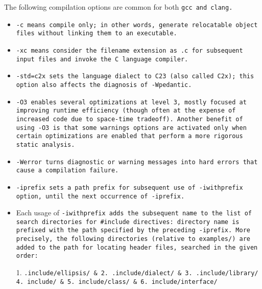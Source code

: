The following compilation options are common for both \tt{gcc} and \tt{clang}.

\begin{itemize}

\item \tt{-c} means compile only; in other words, generate
relocatable object files without linking them to an executable.

\item \tt{-xc} means consider the filename extension as \tt{.c}
for subsequent input files and invoke the C language compiler.

\item \tt{-std=c2x} sets the language dialect to C23 (also called C2x);
this option also affects the diagnosis of \tt{-Wpedantic}.

\item \tt{-O3} enables several optimizations at
level 3, mostly focused at improving runtime efficiency
(though often at the expense of increased code due to space-time tradeoff).
Another benefit of using \tt{-O3} is that some warnings
options are activated only when certain optimizations are
enabled that perform a more rigorous static analysis.

\item \tt{-Werror} turns diagnostic or warning messages
into hard errors that cause a compilation failure.

\item \tt{-iprefix} sets a path prefix for subsequent use of
\tt{-iwithprefix} option, until the next occurrence of \tt{-iprefix}.

\item Each usage of \tt{-iwithprefix} adds the subsequent name to the
list of search directories for \tt{#include} directives: directory name
is prefixed with the path specified by the preceding \tt{-iprefix}.
More precisely, the following directories (relative to \tt{examples/}) are
added to the path for locating header files, searched in the given order:

\enlargethispage*{\baselineskip}


1. \tt{.include/ellipsis/} & 2. \tt{.include/dialect/} & 3. \tt{.include/library/}\\

4. \s\tt{include/} & 5. \s\tt{include/class/} & 6. \s\tt{include/interface/}\\

\elbat


\end{itemize}
